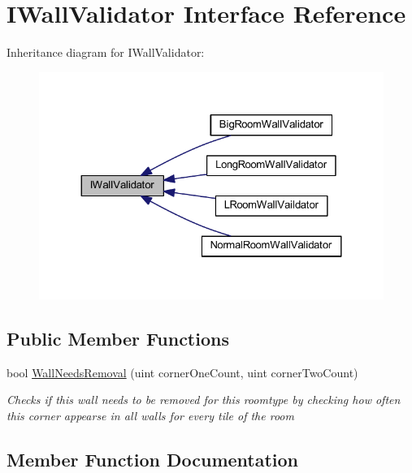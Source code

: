 \hypertarget{interface_i_wall_validator}{}\section{I\+Wall\+Validator Interface Reference}
\label{interface_i_wall_validator}


Inheritance diagram for I\+Wall\+Validator\+:
\nopagebreak
\begin{figure}[H]
\begin{center}
\leavevmode
\includegraphics[width=324pt]{interface_i_wall_validator__inherit__graph}
\end{center}
\end{figure}
\subsection*{Public Member Functions}
\begin{DoxyCompactItemize}
\item 
bool \mbox{\hyperlink{interface_i_wall_validator_a1618acf45bf2614985aeb8b240bf7da8}{Wall\+Needs\+Removal}} (uint corner\+One\+Count, uint corner\+Two\+Count)
\begin{DoxyCompactList}\small\item\em Checks if this wall needs to be removed for this roomtype by checking how often this corner appearse in all walls for every tile of the room \end{DoxyCompactList}\end{DoxyCompactItemize}


\subsection{Member Function Documentation}
\mbox{\label{interface_i_wall_validator_a1618acf45bf2614985aeb8b240bf7da8}} 
